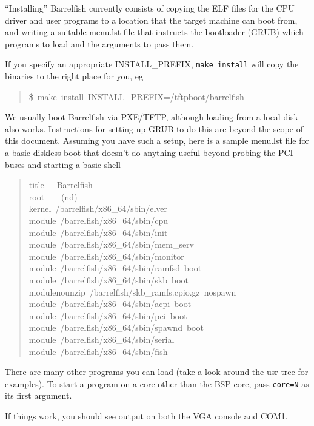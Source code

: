 ``Installing'' Barrelfish currently consists of copying the ELF files for the CPU
driver and user programs to a location that the target machine can boot from,
and writing a suitable menu.lst file that instructs the bootloader (GRUB) which
programs to load and the arguments to pass them.

If you specify an appropriate INSTALL\_PREFIX, \texttt{make install} will copy the
binaries to the right place for you, eg
%
\begin{quote}{\ttfamily \raggedright \noindent
\$~make~install~INSTALL\_PREFIX=/tftpboot/barrelfish
}
\end{quote}

We usually boot Barrelfish via PXE/TFTP, although loading from a local disk
also works. Instructions for setting up GRUB to do this are beyond the scope of
this document. Assuming you have such a setup, here is a sample menu.lst file
for a basic diskless boot that doesn't do anything useful beyond probing the
PCI buses and starting a basic shell
%
\begin{quote}{\ttfamily \raggedright \noindent
title~~~Barrelfish\\
root~~~~(nd)\\
kernel~/barrelfish/x86\_64/sbin/elver\\
module~/barrelfish/x86\_64/sbin/cpu\\
module~/barrelfish/x86\_64/sbin/init\\
module~/barrelfish/x86\_64/sbin/mem\_serv\\
module~/barrelfish/x86\_64/sbin/monitor\\
module~/barrelfish/x86\_64/sbin/ramfsd~boot\\
module~/barrelfish/x86\_64/sbin/skb~boot\\
modulenounzip~/barrelfish/skb\_ramfs.cpio.gz~nospawn\\
module~/barrelfish/x86\_64/sbin/acpi~boot\\
module~/barrelfish/x86\_64/sbin/pci~boot\\
module~/barrelfish/x86\_64/sbin/spawnd~boot\\
module~/barrelfish/x86\_64/sbin/serial\\
module~/barrelfish/x86\_64/sbin/fish
}
\end{quote}

There are many other programs you can load (take a look around the usr tree for
examples). To start a program on a core other than the BSP core, pass
\texttt{core=N} as its first argument.

If things work, you should see output on both the VGA console and COM1.


